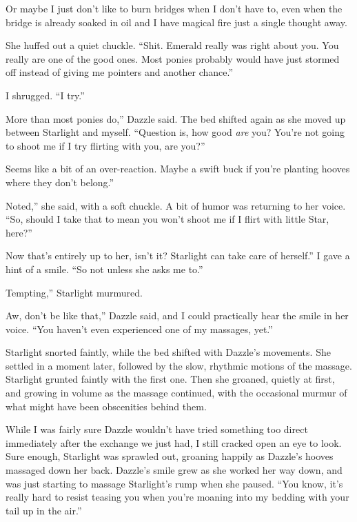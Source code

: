 Or maybe I just don’t like to burn bridges when I don’t have to, even when the bridge is already soaked in oil and I have magical fire just a single thought away.

She huffed out a quiet chuckle. “Shit. Emerald really was right about you. You really are one of the good ones. Most ponies probably would have just stormed off instead of giving me pointers and another chance.”

I shrugged. “I try.”

\leavevmode{}More than most ponies do,” Dazzle said. The bed shifted again as she moved up between Starlight and myself. “Question is, how good \textit{are} you? You’re not going to shoot me if I try flirting with you, are you?”

\leavevmode{}Seems like a bit of an over-reaction. Maybe a swift buck if you’re planting hooves where they don’t belong.”

\leavevmode{}Noted,” she said, with a soft chuckle. A bit of humor was returning to her voice. “So, should I take that to mean you won’t shoot me if I flirt with little Star, here?”

\leavevmode{}Now that’s entirely up to her, isn’t it? Starlight can take care of herself.” I gave a hint of a smile. “So not unless she asks me to.”

\leavevmode{}Tempting,” Starlight murmured.

\leavevmode{}Aw, don’t be like that,” Dazzle said, and I could practically hear the smile in her voice. “You haven’t even experienced one of my massages, yet.”

Starlight snorted faintly, while the bed shifted with Dazzle’s movements. She settled in a moment later, followed by the slow, rhythmic motions of the massage. Starlight grunted faintly with the first one. Then she groaned, quietly at first, and growing in volume as the massage continued, with the occasional murmur of what might have been obscenities behind them.

While I was fairly sure Dazzle wouldn’t have tried something too direct immediately after the exchange we just had, I still cracked open an eye to look. Sure enough, Starlight was sprawled out, groaning happily as Dazzle’s hooves massaged down her back. Dazzle’s smile grew as she worked her way down, and was just starting to massage Starlight’s rump when she paused. “You know, it’s really hard to resist teasing you when you’re moaning into my bedding with your tail up in the air.”

